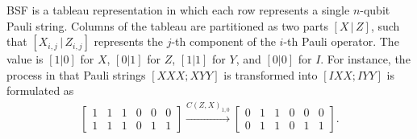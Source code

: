 \documentclass[conference]{IEEEtran}
\begin{document}
    BSF is a tableau representation in which each row represents a single $ n $-qubit Pauli string. Columns of the tableau are partitioned as two parts $ [X\,|\,Z] $, such that $ [X_{i,j}\,|\, Z_{i,j}] $ represents the $ j $-th component of the $ i $-th Pauli operator. The value is $ [1 | 0 ] $ for $ X $, $ [0 | 1 ] $ for $ Z $, $ [1 | 1 ] $ for $ Y $, and $ [0 | 0 ] $ for $ I $. For instance, the process in that Pauli strings $ [XXX; XYY] $ is transformed into $ [IXX; IYY] $ is formulated as 
    \begin{align*}
        \left[
            \begin{array}{ccc|ccc}
            1 & 1 & 1 & 0 & 0 & 0 \\
            1 & 1 & 1 & 0 & 1 & 1
            \end{array}
        \right]
        \xrightarrow{C(Z,X)_{1,0}}
        \left[
            \begin{array}{ccc|ccc}
                0 & 1 & 1 & 0 & 0 & 0 \\
                0 & 1 & 1 & 0 & 1 & 1
            \end{array}
        \right].
    \end{align*}
\end{document}
